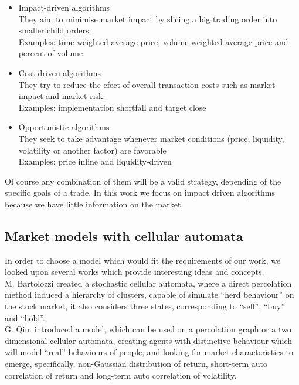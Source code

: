 \documentclass[twoside]{article}
\begin{document}
\begin{multicols}{2}
\begin{itemize}
\item Impact-driven algorithms\\
They aim to minimise market impact by slicing a big trading order into smaller child
orders.\\
Examples: time-weighted average price, volume-weighted average price and
percent of volume
\item Cost-driven algorithms\\
They try to reduce the efect of overall transaction costs such as market impact and
market risk.\\
Examples: implementation shortfall and target close
\item Opportunistic algorithms\\
They seek to take advantage whenever market conditions (price, liquidity, volatility
or another factor) are favorable\\
Examples: price inline and liquidity-driven
\end{itemize}

Of course any combination of them will be a valid strategy, depending of the specific goals of a trade. In this work we focus on impact driven algorithms because we have little information on the market.

\subsection{Market models with cellular automata}

In order to choose a model which would fit the requirements of our work, we looked upon several works which provide interesting ideas and concepts.\\

M. Bartolozzi \cite{PhysRevE.69.046112} created a stochastic cellular automata, where a direct percolation method induced a hierarchy of clusters, capable of simulate ``herd behaviour'' on the stock market, it also considers three states, corresponding to ``sell'', ``buy'' and ``hold''.\\

G. Qiu. \cite{qiu2007understanding} introduced a model, which can be used on a percolation graph or a two dimensional cellular automata, creating agents with distinctive behaviour which will model ``real'' behaviours of people, and looking for market characteristics to emerge, specifically, non-Gaussian distribution of return, short-term auto correlation of return and long-term auto correlation of volatility.\\
 

\end{multicols}
\end{document}
